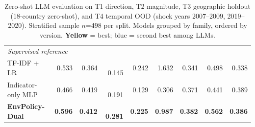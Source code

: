 \begin{table}[!t]
\begin{tabular}{@{}l rrr rr r rr@{}}
\midrule
\multicolumn{9}{l}{\textit{Supervised reference}} \\
TF-IDF + LR & 0.533 & 0.364 & $\phantom{-}$0.145 & 0.242 & 1.632 & 0.341 & 0.498 & 0.338 \\
Indicator-only MLP & 0.466 & 0.419 & $\phantom{-}$0.191 & 0.129 & 0.306 & 0.371 & 0.441 & 0.389 \\
\textbf{EnvPolicy-Dual} & \textbf{0.596} & \textbf{0.412} & $\phantom{-}$\textbf{0.281} & \textbf{0.225} & \textbf{0.987} & \textbf{0.382} & \textbf{0.562} & \textbf{0.386} \\
\bottomrule
\end{tabular}
\caption{Zero-shot LLM evaluation on T1 direction, T2 magnitude, T3 geographic holdout (18-country zero-shot),
and T4 temporal OOD (shock years 2007--2009, 2019--2020). Stratified sample $ n $=498 per split.
Models grouped by family, ordered by version.
\colorbox{bestcell}{\textbf{Yellow}} = best; \colorbox{secondcell}{blue} = second best among LLMs.}
\label{tab:llm_zeroshot}
\end{table}